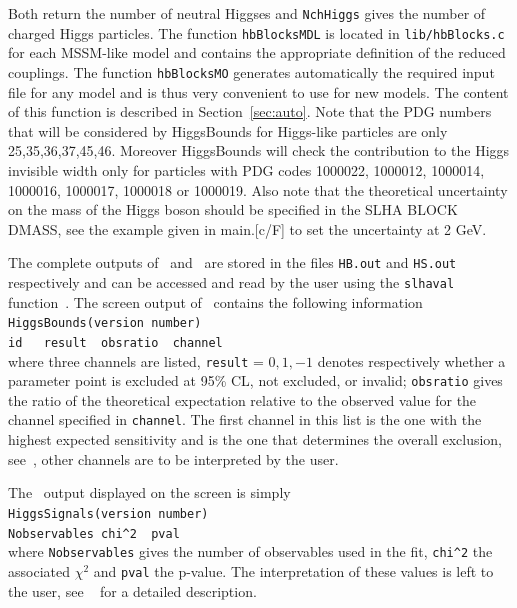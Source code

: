 \documentclass[12pt,a4paper]{article}
\begin{document}
Both return the  number of neutral Higgses and {\tt NchHiggs} gives the number of charged Higgs particles.
The function \verb|hbBlocksMDL|  is located in  \verb|lib/hbBlocks.c| for each MSSM-like model and contains the appropriate definition of the reduced couplings. The function \verb|hbBlocksMO|  generates automatically the required input file for any model and is thus very convenient to use  for new  models. The content of this function is described in Section~\ref{sec:auto}.  Note that the PDG numbers that will be considered by HiggsBounds for Higgs-like particles are only 25,35,36,37,45,46. Moreover HiggsBounds will check the contribution to the Higgs invisible width only for particles with PDG codes  1000022, 1000012, 1000014, 1000016, 1000017, 1000018 or 1000019.
Also note that the theoretical uncertainty  on the  mass of the Higgs boson should be specified in the SLHA BLOCK DMASS, see the example given in  main.[c/F] to set the uncertainty at 2 GeV.

%
The complete outputs of \HB\ and \HS\ are stored in the files  \verb|HB.out| and \verb|HS.out| respectively and can be accessed  and read  by the user using the \verb|slhaval| function~\cite{Belanger:2014hqa}.
The screen output of \micro\ contains the following information\\
 
\noindent
\verb|HiggsBounds(version number)|\\
\verb|id   result  obsratio  channel |\\
 
\noindent
where three channels are listed,  \verb|result| = $0,1,-1$ denotes respectively whether a parameter point is excluded at 95\% CL, not excluded, or invalid; \verb|obsratio| gives the ratio of the theoretical expectation relative to the observed value  for the channel specified in \verb|channel|. The first channel in this list is the one with the highest expected sensitivity and is the one that determines the overall exclusion, see~\cite{Bechtle:2013wla}, other channels are to be interpreted by the user. 


The \HS\ output displayed on the screen is simply \\

\noindent
\verb|HiggsSignals(version number)|\\
\verb|Nobservables chi^2  pval|\\

\noindent
where \verb|Nobservables| gives the number of observables used in the fit, \verb|chi^2| the associated $\chi^2$ and \verb|pval| the p-value. 
The interpretation of these values is left to the user, see ~\cite{Bechtle:2013xfa} for a detailed description.
\end{document}
